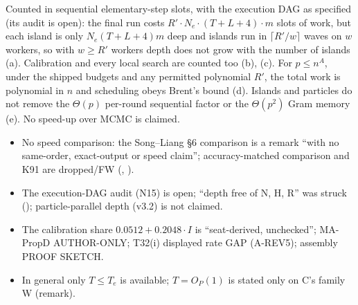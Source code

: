 \begin{plain}
Counted in sequential elementary-step slots, with the execution DAG as specified (its audit is open): the final run costs $R'\cdot N_e\cdot(T+L+4)\cdot m$ slots of work, but each island is only $N_e(T+L+4)m$ deep and islands run in $\lceil R'/w\rceil$ waves on $w$ workers, so with $w\ge R'$ workers depth does not grow with the number of islands (a). Calibration and every local search are counted too (b), (c). For $p\le n^A$, under the shipped budgets and any permitted polynomial $R'$, the total work is polynomial in $n$ and scheduling obeys Brent's bound (d). Islands and particles do not remove the $\Theta(p)$ per-round sequential factor or the $\Theta(p^2)$ Gram memory (e). No speed-up over MCMC is claimed.
\end{plain}

\begin{notproved}
\begin{itemize}
\item No speed comparison: the Song–Liang §6 comparison is a remark ``with no same-order, exact-output or speed claim''; accuracy-matched comparison and K91 are dropped/FW (, ).
\item The execution-DAG audit (N15) is open; ``depth free of N, H, R'' was struck (); particle-parallel depth (v3.2) is not claimed.
\item The calibration share $0.0512+0.2048\cdot I$ is ``seat-derived, unchecked''; MA-PropD AUTHOR-ONLY; T32(i) displayed rate GAP (A-REV5); assembly PROOF SKETCH.
\item In general only $T\le T_e$ is available; $T=O_P(1)$ is stated only on C's family W (remark).
\end{itemize}
\end{notproved}

